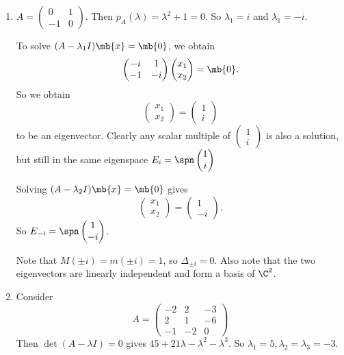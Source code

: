 \documentclass[a4paper]{article}
\begin{document}
\begin{eg}\leavevmode
  \begin{enumerate}
  \item $A = \begin{pmatrix} 0 & 1\\
    -1 & 0
  \end{pmatrix}$. Then $p_A(\lambda) = \lambda^2 + 1 = 0$. So $\lambda_1 = i$ and $\lambda_1 = -i$.

    To solve $(A - \lambda_1 I)\mb{x} = \mb{0}$, we obtain
    \[
    \begin{pmatrix}
      -i & 1\\-1 & -i
    \end{pmatrix}
    \begin{pmatrix}
      x_1\\x_2
    \end{pmatrix}
     = \mb{0}.
     \]
     So we obtain
     \[
     \begin{pmatrix}
       x_1\\x_2
     \end{pmatrix} =
     \begin{pmatrix}
       1\\i
     \end{pmatrix}
     \]
     to be an eigenvector. Clearly any scalar multiple of $\begin{pmatrix}
       1\\i
     \end{pmatrix}$ is also a solution, but still in the same eigenspace $E_i = \spn \begin{pmatrix}
       1\\i
     \end{pmatrix}$

     Solving $(A - \lambda_2I)\mb{x} = \mb{0}$ gives 
     \[
     \begin{pmatrix}
       x_1\\x_2
     \end{pmatrix} =
     \begin{pmatrix}
       1\\-i
     \end{pmatrix}.
     \]
     So $E_{-i} = \spn
     \begin{pmatrix}
       1\\-i
     \end{pmatrix}$.

     Note that $M(\pm i) = m(\pm i) = 1$, so $\Delta_{\pm i} = 0$. Also note that the two eigenvectors are linearly independent and form a basis of $\C^2$.
   \item Consider
     \[
     A = \begin{pmatrix}
     -2 & 2 & -3\\
     2 & 1 & -6\\
     -1 & -2 & 0
     \end{pmatrix}
     \]
     Then $\det(A - \lambda I) = 0$ gives $45 + 21\lambda - \lambda^2 - \lambda^3$. So $\lambda_1 = 5, \lambda_2 = \lambda_3 = -3$.


\end{enumerate}
\end{eg}
\end{document}
